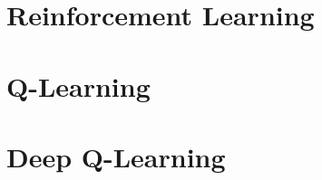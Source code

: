 


\section{Reinforcement Learning} \label{reinforcement-learning}

\section{Q-Learning}


\section{Deep Q-Learning}


